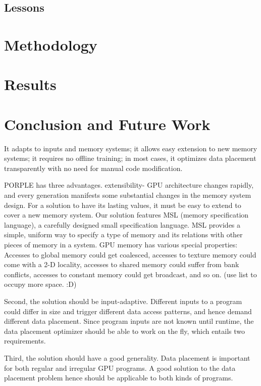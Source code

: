 \documentclass{sig-alternate}
\begin{document}
\subsection{Lessons}

\section{Methodology}

\section{Results}

\section{Conclusion and Future Work}


It adapts to inputs and memory systems; it allows easy extension to new memory systems; it requires no offline training; in most cases, it optimizes data placement transparently with no need for manual code modification.

PORPLE has three advantages. 
extensibility- GPU architecture changes rapidly, and every generation manifests some substantial changes in the memory system design. For a solution to have its lasting values, it must be easy to extend to cover a new memory system. 
Our solution features MSL (memory specification language), a carefully designed small specification language. MSL provides a simple, uniform way to specify a type of memory and its relations with other pieces of memory in a system. GPU memory has various special properties: Accesses to global memory could get coalesced, accesses to texture memory could come with a 2-D locality, accesses to shared memory could suffer from bank conflicts, accesses to constant memory could get broadcast, and so on. (use list to occupy more space. :D)

Second, the solution should be input-adaptive. Different inputs to a program could differ in size and trigger different data access patterns, and hence demand different data placement. Since program inputs are not known until runtime, the data placement optimizer should be able to work on the fly, which entails two requirements. 

Third, the solution should have a good generality. Data placement is important for both regular and irregular GPU programs. A good solution to the data placement problem hence should be applicable to both kinds of programs.  
 
\end{document}
